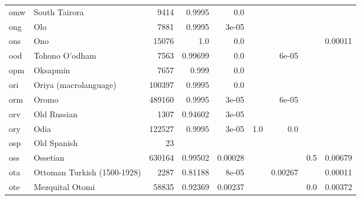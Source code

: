 \documentclass[11pt]{article}
\begin{document}
\begin{table*}[h]
{\begin{tabular}{llrrrrrrr}
omw         & South Tairora         & 9414         & 0.9995         & 0.0         &          &          &          &          \\

ong         & Olo         & 7881         & 0.9995         & 3e-05         &          &          &          &          \\

ons         & Ono         & 15076         & 1.0         & 0.0         &          &          &          & 0.00011         \\

ood         & Tohono O'odham         & 7563         & 0.99699         & 0.0         &          & 6e-05         &          &          \\

opm         & Oksapmin         & 7657         & 0.999         & 0.0         &          &          &          &          \\

ori         & Oriya (macrolanguage)         & 100397         & 0.9995         & 0.0         &          &          &          &          \\

orm         & Oromo         & 489160         & 0.9995         & 3e-05         &          & 6e-05         &          &          \\

orv         & Old Russian         & 1307         & 0.94602         & 3e-05         &          &          &          &          \\

ory         & Odia         & 122527         & 0.9995         & 3e-05         & 1.0         & 0.0         &          &          \\

osp         & Old Spanish         & 23         &          &          &          &          &          &          \\

oss         & Ossetian         & 630164         & 0.99502         & 0.00028         &          &          & 0.5         & 0.00679         \\

ota         & Ottoman Turkish (1500-1928)         & 2287         & 0.81188         & 8e-05         &          & 0.00267         &          & 0.00011         \\

ote         & Mezquital Otomi         & 58835         & 0.92369         & 0.00237         &          &          & 0.0         & 0.00372         \\


\end{tabular}}
\end{table*}
\end{document}
